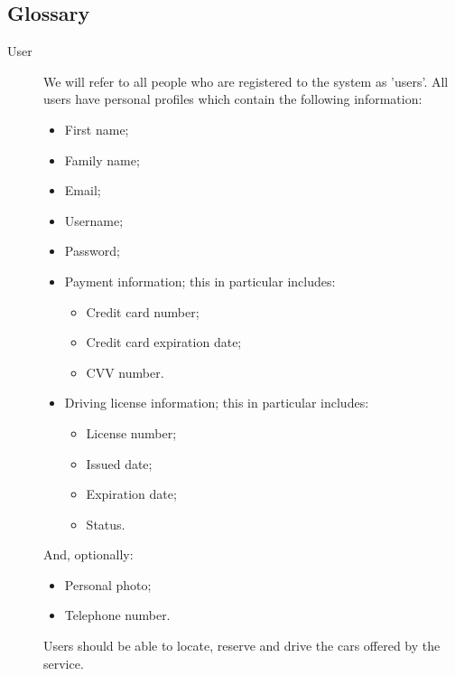 \documentclass{article}
\begin{document}
		\subsection{Glossary}
			\begin{description}
				\item[User] We will refer to all people who are registered to the system as 'users'. All users have personal profiles which contain the following information:
				\begin{itemize}
					\item First name;
					\item Family name; %
					\item Email;
					\item Username;
					\item Password;
					\item Payment information; this in particular includes:
						\begin{itemize}
							\item Credit card number;
							\item Credit card expiration date;
							\item CVV number.
						\end{itemize}
					\item Driving license information; this in particular includes:
						\begin{itemize}
							\item License number;
							\item Issued date;
							\item Expiration date;
							\item Status. %
						\end{itemize}
				\end{itemize}
				And, optionally:
				\begin{itemize}		
					\item Personal photo;
					\item Telephone number. %
				\end{itemize}
				Users should be able to locate, reserve and drive the cars offered by the service. %
				

\end{description}
\end{document}
